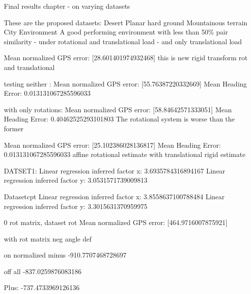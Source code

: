 

Final results chapter - on varying datasets

These are the proposed datasets: 
Desert 
Planar hard ground
Mountainous terrain
City Environment 
A good performing environment with less than 50\% pair similarity - under rotational and translational load - and only translational load




Mean normalized GPS error: [28.601401974932468]
this is new rigid transform rot and translational

testing neither :
Mean normalized GPS error: [55.76387220332669]
Mean Heading Error: 0.013131067285596033

with only rotations:
Mean normalized GPS error: [58.84642571333051]
Mean Heading Error: 0.40462525293101803
The rotational system is worse than the former

Mean normalized GPS error: [25.102386028136817]
Mean Heading Error: 0.013131067285596033
affine rotational estimate with translational rigid estimate 



DATSET1:
Linear regression inferred factor x: 3.6935784316894167
Linear regression inferred factor y: 3.0531571739009813

Datasetcpt
Linear regression inferred factor x: 3.8558637100788484
Linear regression inferred factor y: 3.3015631370959975



0 rot matrix, dataset rot
Mean normalized GPS error: [464.9716007875921]

with rot matrix neg angle def



on normalized minus
-910.7707468728697


off all
-837.0259876083186

Plus:
-737.4733969126136

